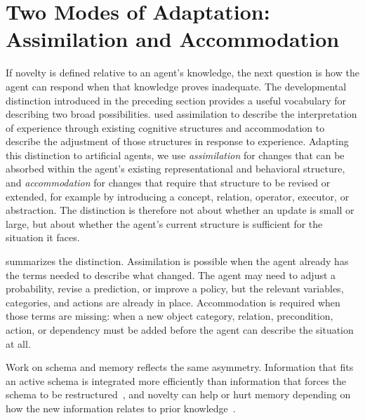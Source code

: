 
\section{Two Modes of Adaptation: Assimilation and Accommodation}
\label{sec:assimilation_accommodation}
\label{sec:landscape_of_change}
\label{sec:computational_open_world}

If novelty is defined relative to an agent's knowledge, the next question is how the agent can respond when that knowledge proves inadequate.
The developmental distinction introduced in the preceding section provides a useful vocabulary for describing two broad possibilities.
\citet{piaget1952origins} used assimilation to describe the interpretation of experience through existing cognitive structures and accommodation to describe the adjustment of those structures in response to experience.
Adapting this distinction to artificial agents, we use \emph{assimilation} for changes that can be absorbed within the agent's existing representational and behavioral structure, and \emph{accommodation} for changes that require that structure to be revised or extended, for example by introducing a concept, relation, operator, executor, or abstraction.
The distinction is therefore not about whether an update is small or large, but about whether the agent's current structure is sufficient for the situation it faces.

 summarizes the distinction.
Assimilation is possible when the agent already has the terms needed to describe what changed.
The agent may need to adjust a probability, revise a prediction, or improve a policy, but the relevant variables, categories, and actions are already in place.
Accommodation is required when those terms are missing: when a new object category, relation, precondition, action, or dependency must be added before the agent can describe the situation at all.


Work on schema and memory reflects the same asymmetry.
Information that fits an active schema is integrated more efficiently than information that forces the schema to be restructured~\citep{sommer2022assimilation}, and novelty can help or hurt memory depending on how the new information relates to prior knowledge~\citep{quent2021predictive}.

